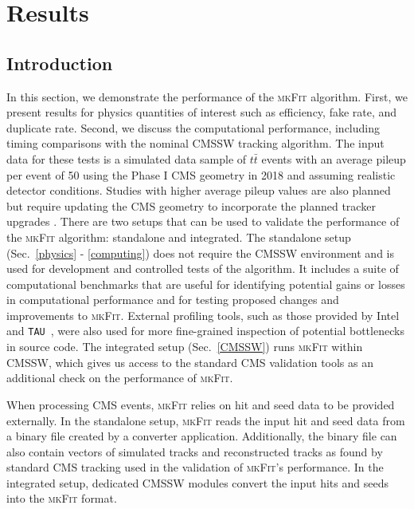 \documentclass[a4paper,11pt]{article}
\newcommand{\ttbar}{\ensuremath{t\bar{t}}\xspace}
\newcommand{\mkFit}{\textsc{mkFit}\xspace}
\newcommand{\Intel}{Intel\textregistered\xspace}
\begin{document}


\section{Results}
\label{sec:Results}

\subsection{Introduction}

In this section, we demonstrate the performance of the \mkFit algorithm. First, we present results for physics quantities of interest such as efficiency, fake rate, and duplicate rate. Second, we discuss the computational performance, including timing comparisons with the nominal CMSSW tracking algorithm. The input data for these tests is a simulated data sample of \ttbar events with an average pileup per event of 50 using the Phase I CMS geometry in 2018 and assuming realistic detector conditions. Studies with higher average pileup values are also planned but require updating the CMS geometry to incorporate the planned tracker upgrades \cite{PhaseIIpaper}. There are two setups that can be used to validate the performance of the \mkFit algorithm: standalone and integrated. The standalone setup  (Sec.~\ref{physics} - \ref{computing}) does not require the CMSSW environment and is used for development and controlled tests of the algorithm. It includes a suite of computational benchmarks that are useful for identifying potential gains or losses in computational performance and for testing proposed changes and improvements to \mkFit. External profiling tools, such as those provided by \Intel and \texttt{TAU}~\cite{TAU}, were also used for more fine-grained inspection of potential bottlenecks in source code.
The integrated setup (Sec.~\ref{CMSSW}) runs \mkFit within CMSSW, which gives us access to the standard CMS validation tools as an additional check on the performance of \mkFit. 

When processing CMS events, \mkFit relies on hit and seed data to be provided externally. In the standalone setup, \mkFit reads the input hit and seed data from a binary file created by a converter application. Additionally, the binary file can also contain vectors of simulated tracks and reconstructed tracks as found by standard CMS tracking used in the validation of \mkFit's performance. In the integrated setup, dedicated CMSSW modules convert the input hits and seeds into the \mkFit format. 
\end{document}
